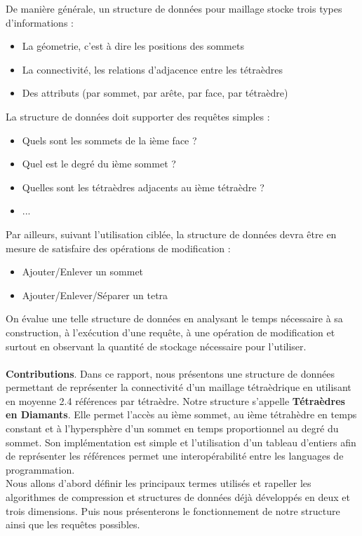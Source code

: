 \documentclass[a4paper,11pt,openany]{article}
\begin{document}
De manière générale, un structure de données pour maillage stocke trois types d'informations :
\begin{itemize}
\item La géometrie, c'est à dire les positions des sommets
\item La connectivité, les relations d'adjacence entre les tétraèdres
\item Des attributs (par sommet, par arête, par face, par tétraèdre)
\end{itemize}
La structure de données doit supporter des requêtes simples :
\begin{itemize}
\item Quels sont les sommets de la ième face ?
\item Quel est le degré du ième sommet ?
\item Quelles sont les tétraèdres adjacents au ième tétraèdre ?
\item ...
\end{itemize}
Par ailleurs, suivant l'utilisation ciblée, la structure de données devra être en mesure de satisfaire des opérations de modification :
\begin{itemize}
\item Ajouter/Enlever un sommet
\item Ajouter/Enlever/Séparer un tetra\\
\end{itemize}
On évalue une telle structure de données en analysant le temps nécessaire à sa construction, à l'exécution d'une requête, à une opération de modification et surtout en observant la quantité de stockage nécessaire pour l'utiliser.\\\\
\textbf{Contributions}. Dans ce rapport, nous présentons une structure de données permettant de représenter la connectivité d'un maillage tétraèdrique en utilisant en moyenne 2.4 références par tétraèdre. Notre structure s'appelle \textbf{Tétraèdres en Diamants}. Elle permet l'accès au ième sommet, au ième tétrahèdre en temps constant et à l'hypersphère d'un sommet en temps proportionnel au degré du sommet. Son implémentation est simple et l'utilisation d'un tableau d'entiers afin de représenter les références permet une interopérabilité entre les languages de programmation.\\
Nous allons d'abord définir les principaux termes utilisés et rapeller les algorithmes de compression et structures de données déjà développés en deux et trois dimensions. Puis nous présenterons le fonctionnement de notre structure ainsi que les requêtes possibles.
\end{document}
